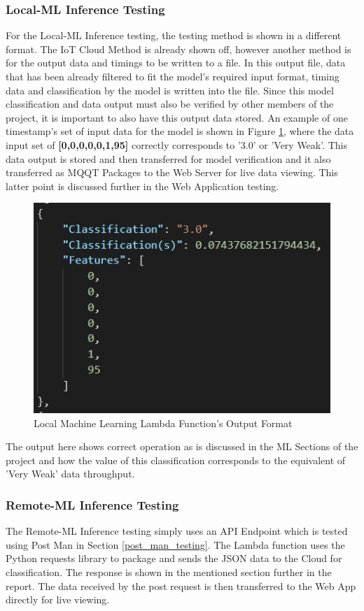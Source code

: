 \subsubsection{Local-ML Inference Testing}
For the Local-ML Inference testing, the testing method is shown in a different format. The IoT Cloud Method is already shown off, however another method is for the output data and timings to be written to a file. In this output file, data that has been already filtered to fit the model's required input format, timing data and classification by the model is written into the file. Since this model classification and data output must also be verified by other members of the project, it is important to also have this output data stored. An example of one timestamp's set of input data for the model is shown in Figure \ref{fig:local-ml-output}, where the data input set of \textbf{[0,0,0,0,0,1,95]} correctly corresponds to '3.0' or 'Very Weak'. This data output is stored and then transferred for model verification and it also transferred as MQQT Packages to the Web Server for live data viewing. This latter point is discussed further in the Web Application testing.

\begin{figure}[ht]
    \centering
    \includegraphics[width=0.5\linewidth]{pages/Chapter5/Chapter 5 images/Lambda-Fns/local_ml_fn_output.png}
    \caption{Local Machine Learning Lambda Function's Output Format}
    \label{fig:local-ml-output}
\end{figure}

The output here shows correct operation as is discussed in the ML Sections of the project and how the value of this classification corresponds to the equivalent of 'Very Weak' data throughput.


\subsubsection{Remote-ML Inference Testing}
The Remote-ML Inference testing simply uses an API Endpoint which is tested using Post Man in Section \ref{post_man_testing}. The Lambda function uses the Python requests library to package and sends the JSON data to the Cloud for classification. The response is shown in the mentioned section further in the report. The data received by the post request is then transferred to the Web App directly for live viewing.


